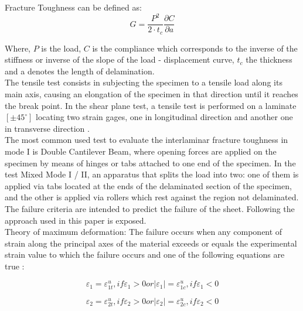 Fracture Toughness can be defined as:
\begin{equation}
G=\frac{P^2}{2\cdot t_c} \frac{\partial C}{\partial a}
\end{equation}

Where, $P$ is the load, $C$ is the compliance which corresponds to the inverse of the stiffness or inverse of the slope of the load - displacement curve, $t_c$ the thickness and a denotes the length of delamination.\\ 

The tensile test consists in subjecting the specimen to a tensile load along its main axis, causing an elongation of the specimen in that direction until it reaches the break point. In the  shear plane test, a tensile test is performed on a laminate $[\pm 45^\circ]$ locating two strain gages, one in longitudinal direction and another one in transverse direction \cite{miravete}.\\

The most common used test to evaluate the interlaminar fracture toughness in mode I is Double Cantilever Beam, where opening forces are applied on the specimen by means of hinges or tabs attached to one end of the specimen. In the test Mixed Mode I / II, an apparatus that splits the load into two: one of them is applied via tabs located at the ends of the delaminated section of the specimen, and the other is applied via rollers which rest against the region not delaminated.\\ 

The failure criteria are intended to predict the failure of the sheet. Following the approach used in this paper is exposed.\\ 

Theory of maximum deformation: The failure occurs when any component of strain along the principal axes of the material exceeds or equals the experimental strain value to which the failure occurs and one of the following equations are true \cite{arias}:

\begin{equation}
\varepsilon_1=\varepsilon_{1t}^u,   if   \varepsilon_1>0   or   |\varepsilon_1|=\varepsilon_{1c}^u,   if   \varepsilon_1<0
\end{equation}

\begin{equation}
\varepsilon_2=\varepsilon_{2t}^u,   if   \varepsilon_2>0   or   |\varepsilon_2|=\varepsilon_{2c}^u,   if   \varepsilon_2<0
\end{equation}

